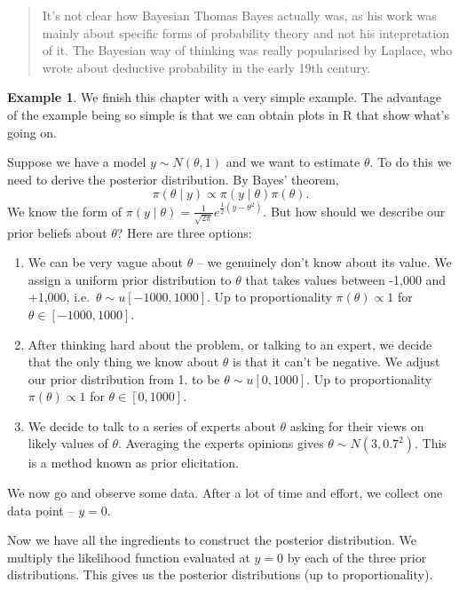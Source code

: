 \documentclass[
]{book}
\theoremstyle{definition}
\theoremstyle{definition}
\newtheorem{example}{Example}[chapter]
\theoremstyle{definition}
\theoremstyle{definition}
\theoremstyle{remark}
\begin{document}
\begin{quote}
It's not clear how Bayesian Thomas Bayes actually was, as his work was mainly about specific forms of probability theory and not his intepretation of it. The Bayesian way of thinking was really popularised by Laplace, who wrote about deductive probability in the early 19th century.
\end{quote}

\begin{example}
We finish this chapter with a very simple example. The advantage of the example being so simple is that we can obtain plots in R that show what's going on.

Suppose we have a model \(y \sim N(\theta, 1)\) and we want to estimate \(\theta\). To do this we need to derive the posterior distribution. By Bayes' theorem,
\[
\pi(\theta \mid y) \propto \pi(y \mid \theta) \pi(\theta).
\]
We know the form of \(\pi(y \mid \theta) = \frac{1}{\sqrt{2\pi}}e^{\frac{1}{2}(y - \theta^2)}\). But how should we describe our prior beliefs about \(\theta\)? Here are three options:

\begin{enumerate}
\def\labelenumi{\arabic{enumi}.}
\item
  We can be very vague about \(\theta\) -- we genuinely don't know about its value. We assign a uniform prior distribution to \(\theta\) that takes values between -1,000 and +1,000, i.e.~\(\theta \sim u[-1000, 1000]\). Up to proportionality \(\pi(\theta) \propto 1\) for \(\theta \in [-1000, 1000]\).
\item
  After thinking hard about the problem, or talking to an expert, we decide that the only thing we know about \(\theta\) is that it can't be negative. We adjust our prior distribution from 1. to be \(\theta \sim u[0, 1000]\). Up to proportionality \(\pi(\theta) \propto 1\) for \(\theta \in [0, 1000]\).
\item
  We decide to talk to a series of experts about \(\theta\) asking for their views on likely values of \(\theta\). Averaging the experts opinions gives \(\theta \sim N(3, 0.7^2)\). This is a method known as prior elicitation.
\end{enumerate}

We now go and observe some data. After a lot of time and effort, we collect one data point -- \(y = 0\).

Now we have all the ingredients to construct the posterior distribution. We multiply the likelihood function evaluated at \(y = 0\) by each of the three prior distributions. This gives us the posterior distributions (up to proportionality).


\end{example}
\end{document}
